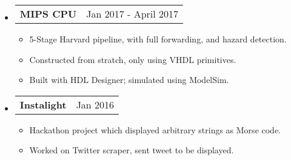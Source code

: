 \documentclass[18pt]{article}
\makeatletter
\providecommand{\tightlist}{
    \setlength{\itemsep}{0pt}\setlength{\parskip}{0pt}
}
\providecommand{\datetable}[2]{
    \begin{tabular*}{\textwidth}{@{}r @{\extracolsep{\fill}} l}
        #1 & #2
    \end{tabular*}
}
\makeatother
\begin{document}
\begin{itemize}[label={}]
        \item \datetable{\textbf{MIPS CPU}}{Jan 2017 - April 2017}
        \begin{itemize}\tightlist
            \item 5-Stage Harvard pipeline, with full forwarding, and hazard detection.
            \item Constructed from stratch, only using VHDL primitives.
            \item Built with HDL Designer; simulated using ModelSim.
        \end{itemize}
      
      
            
        \item \datetable{\textbf{Instalight}}{Jan 2016}
        \begin{itemize}\tightlist
            \item Hackathon project which displayed arbitrary strings as Morse code.
            \item Worked on Twitter scraper, sent tweet to be displayed.
        \end{itemize}
        
  \end{itemize}
    
\end{document}
